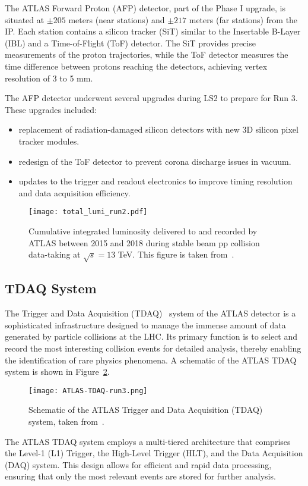         The ATLAS Forward Proton (AFP) detector, part of the Phase I upgrade, is situated at $\pm205$ meters 
        (near stations) and $\pm217$ meters (far stations) from the IP. Each station contains a silicon 
        tracker (SiT) similar to the Insertable B-Layer (IBL) and a Time-of-Flight (ToF) detector. The 
        SiT provides precise measurements of the proton trajectories, while the ToF detector measures 
        the time difference between protons reaching the detectors, achieving vertex resolution of 3 to 5 mm.

        The AFP detector underwent several upgrades during LS2 to prepare for Run 3. These upgrades included:
        \begin{itemize}
            \item replacement of radiation-damaged silicon detectors with new 3D silicon pixel tracker modules.
            \item redesign of the ToF detector to prevent corona discharge issues in vacuum.
            \item updates to the trigger and readout electronics to improve timing resolution and data acquisition efficiency.
        \end{itemize}

        \begin{figure}[htbp]
            \centering
            \texttt{[image: total\_lumi\_run2.pdf]}
            \caption{
                Cumulative integrated luminosity delivered to and recorded by ATLAS between 2015 and 2018 during stable beam pp collision data-taking at $\sqrt{s}=13$ TeV. This figure is taken from~\cite{DAPR-2018-01}.
            }
            \label{fig:run2lumi}
        \end{figure}

    \subsection{TDAQ System}
        The Trigger and Data Acquisition (TDAQ)~\cite{ATLAS-TDR-16} system of the ATLAS detector is a 
        sophisticated infrastructure designed to manage the immense amount of data generated by particle 
        collisions at the LHC. Its primary function is to select and record the most interesting 
        collision events for detailed analysis, thereby enabling the identification of rare physics 
        phenomena. A schematic of the ATLAS TDAQ system is shown in Figure~\ref{fig:TDAQ_schematic}.
        \begin{figure}[htbp]
            \centering
            \texttt{[image: ATLAS-TDAQ-run3.png]}
            \caption{Schematic of the ATLAS Trigger and Data Acquisition (TDAQ) system, taken from~\cite{GENR-2019-02}.}
            \label{fig:TDAQ_schematic}
        \end{figure}
        The ATLAS TDAQ system employs a multi-tiered architecture that comprises the Level-1 (L1) Trigger, 
        the High-Level Trigger (HLT), and the Data Acquisition (DAQ) system. This design allows for efficient 
        and rapid data processing, ensuring that only the most relevant events are stored for further analysis. 

